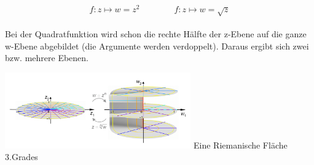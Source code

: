 	\begin{minipage}{9cm}
    	$$ f : z \mapsto w = z^2 \qquad \qquad f : z \mapsto w = \sqrt{z} $$\\
		Bei der Quadratfunktion wird schon die rechte Hälfte der z-Ebene auf die ganze
		w-Ebene abgebildet (die Argumente werden verdoppelt). Daraus ergibt sich
		zwei bzw. mehrere Ebenen.
    \end{minipage}
	\hspace{2cm}
	\begin{minipage}{8cm}
    	\includegraphics[width=8cm]{./bilder/RiemannischeFlaeche.png} 
    	Eine Riemanische Fläche 3.Grades
    \end{minipage}

